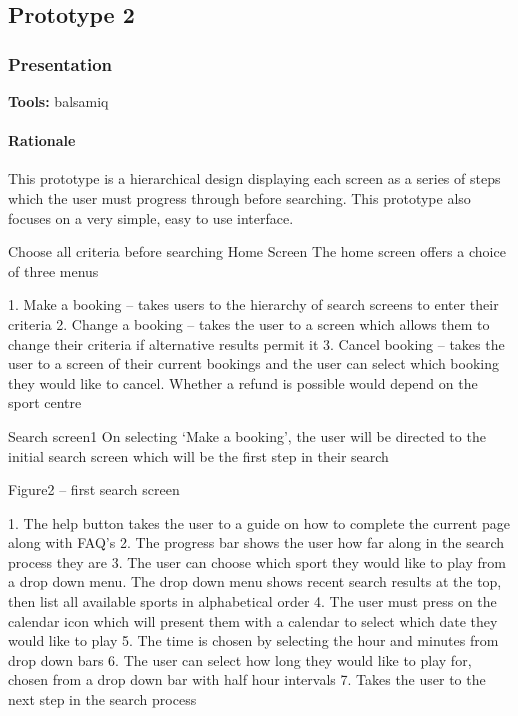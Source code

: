 \subsection{Prototype 2}

\subsubsection{Presentation}
\textbf{Tools:} balsamiq

\paragraph{Rationale}
This prototype is a hierarchical design displaying each screen as a series of
steps which the user must progress through before searching. This prototype
also focuses on a very simple, easy to use interface.

Choose all criteria before searching
Home Screen
The home screen offers a choice of three menus


1.       Make a booking – takes users to the hierarchy of search screens to enter their criteria
2.       Change a booking – takes the user to a screen which allows them to change their criteria if alternative results permit it
3.       Cancel booking – takes the user to a screen of their current bookings and the user can select which booking they would like to cancel. Whether a refund is possible would depend on the sport centre

Search screen1
On selecting ‘Make a booking’, the user will be directed to the initial search screen which will be the first step in their search

Figure2 – first search screen

1.       The help button takes the user to a guide on how to complete the current page along with FAQ's
2.       The progress bar shows the user how far along in the search process they are
3.       The user can choose which sport they would like to play from a drop down menu. The drop down menu shows recent search results at the top, then list all available sports in alphabetical order
4.       The user must press on the calendar icon which will present them with a calendar to select which date they would like to play
5.       The time is chosen by selecting the hour and minutes from drop down bars
6.       The user can select how long they would like to play for, chosen from a drop down bar with half hour intervals
7.       Takes the user to the next step in the search process

